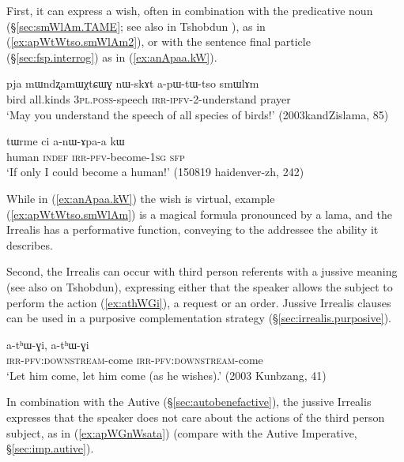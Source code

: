 First, it can express a wish, often in combination with the predicative noun  (§\ref{sec:smWlAm.TAME}; see also in Tshobdun \citealt[804]{jackson07irrealis}), as in (\ref{ex:apWtWtso.smWlAm2}), or with the sentence final particle  (§\ref{sec:fsp.interrog}) as in (\ref{ex:anApaa.kW}).

\begin{exe}
\ex \label{ex:apWtWtso.smWlAm2}
\gll pja mɯndʐamɯχtɕɯɣ nɯ-skɤt a-pɯ-tɯ-tso smɯlɤm\\
bird all.kinds \textsc{3pl}.\textsc{poss}-speech \textsc{irr}-\textsc{ipfv}-2-understand prayer\\
\glt `May you understand the speech of all species of birds!' (2003kandZislama, 85)
\end{exe}

\begin{exe}
\ex \label{ex:anApaa.kW}
\gll tɯrme ci a-nɯ-ɤpa-a kɯ \\
human \textsc{indef} \textsc{irr}-\textsc{pfv}-become-\textsc{1sg} \textsc{sfp} \\
\glt `If only I could become a human!' (150819 haidenver-zh, 242)
\end{exe}

While in (\ref{ex:anApaa.kW}) the wish is virtual, example (\ref{ex:apWtWtso.smWlAm}) is a magical formula pronounced by a lama, and the Irrealis has a performative function, conveying to the addressee the ability it describes.


Second, the Irrealis can occur with third person referents with a jussive meaning (see also \citealt[811]{jackson07irrealis} on Tshobdun), expressing either that the speaker allows the subject to perform the action (\ref{ex:athWGi}), a request or an order. Jussive Irrealis clauses can be used in a purposive complementation strategy (§\ref{sec:irrealis.purposive}).

\begin{exe}
\ex \label{ex:athWGi}
\gll a-tʰɯ-ɣi, a-tʰɯ-ɣi \\
\textsc{irr}-\textsc{pfv}:\textsc{downstream}-come \textsc{irr}-\textsc{pfv}:\textsc{downstream}-come \\
\glt `Let him come, let him come (as he wishes).' (2003 Kunbzang, 41)
\end{exe}

In combination with the Autive (§\ref{sec:autobenefactive}), the jussive Irrealis expresses that the speaker does not care about the actions of the third person subject, as in (\ref{ex:apWGnWsata}) (compare with the Autive Imperative, §\ref{sec:imp.autive}).

